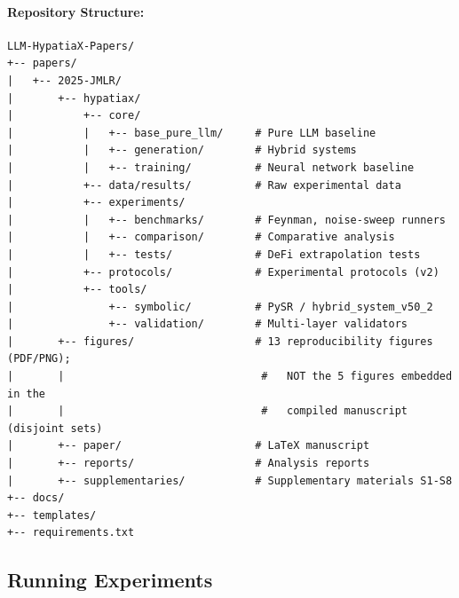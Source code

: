 \documentclass[11pt,a4paper]{article}
\begin{document}
\paragraph{Repository Structure:}
\begin{small}
\begin{verbatim}
LLM-HypatiaX-Papers/
+-- papers/
|   +-- 2025-JMLR/
|       +-- hypatiax/
|           +-- core/
|           |   +-- base_pure_llm/     # Pure LLM baseline
|           |   +-- generation/        # Hybrid systems
|           |   +-- training/          # Neural network baseline
|           +-- data/results/          # Raw experimental data
|           +-- experiments/
|           |   +-- benchmarks/        # Feynman, noise-sweep runners
|           |   +-- comparison/        # Comparative analysis
|           |   +-- tests/             # DeFi extrapolation tests
|           +-- protocols/             # Experimental protocols (v2)
|           +-- tools/
|               +-- symbolic/          # PySR / hybrid_system_v50_2
|               +-- validation/        # Multi-layer validators
|       +-- figures/                   # 13 reproducibility figures (PDF/PNG);
|       |                               #   NOT the 5 figures embedded in the
|       |                               #   compiled manuscript (disjoint sets)
|       +-- paper/                     # LaTeX manuscript
|       +-- reports/                   # Analysis reports
|       +-- supplementaries/           # Supplementary materials S1-S8
+-- docs/
+-- templates/
+-- requirements.txt
\end{verbatim}
\end{small}

\subsection{Running Experiments}
\end{document}
